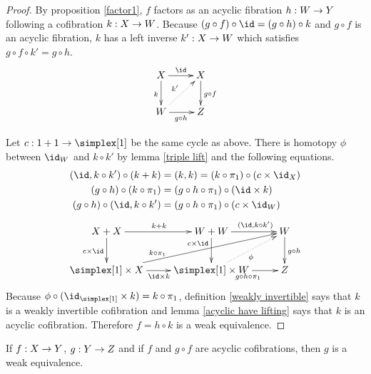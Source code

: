 \documentclass[csh.tex]{subfiles}
\begin{document}
\begin{proof} By proposition \ref{factor1}, $f$ factors as an acyclic fibration $h: W\to Y$ following a cofibration $k: X\to W$. Because $(g\circ f)\circ \id = (g\circ h)\circ k$ and $g\circ f$ is an acyclic fibration, $k$ has a left inverse $k': X\to W$ which satisfies $g\circ f\circ k' = g\circ h$. 
\[\xymatrix{
X\ar[d]_k \ar[r]^\id & X\ar[d]^{g\circ f}\\
W\ar[r]_{g\circ h} \ar@{.>}[ur]^{k'} & Z
}\]

Let $c\of 1+1\to\simplex[1]$ be the same cycle as above. There is homotopy $\phi$ between $\id_W$ and $k\circ k'$ by lemma \ref{triple lift} and the following equations.
\begin{align*}
(\id,k\circ k')\circ(k+k) &= (k,k) = (k\circ\pi_1)\circ (c\times\id_X)\\
(g\circ h)\circ (k\circ \pi_1) &= (g\circ h\circ \pi_1)\circ(\id\times k)\\
(g\circ h)\circ (\id,k\circ k') &= (g\circ h\circ \pi_1)\circ(c\times\id_W)
\end{align*}
\[\xymatrix{
X+X \ar[d]_{c\times \id}\ar[r]^{k+k} & W+W\ar[d]_(.3){c\times\id}\ar[r]^(.6){(\id,k\circ k')} & W\ar[d]^{g\circ h}\\
\simplex[1]\times X \ar[r]_{\id\times k}\ar[urr]^(.3){k\circ\pi_1}& \simplex[1]\times W\ar[r]_{g\circ h\circ \pi_1}\ar@{.>}[ur]_\phi & Z
}\]
Because $\phi\circ (\id_{\simplex[1]}\times k)=k\circ \pi_1$, definition \ref{weakly invertible} says that $k$ is a weakly invertible cofibration and lemma \ref{acyclic have lifting} says that $k$ is an acyclic cofibration. Therefore $f = h\circ k$ is a weak equivalence.\end{proof}

\begin{lemma} If $f: X\to Y$, $g: Y\to Z$ and if $f$ and $g\circ f$ are acyclic cofibrations, then $g$ is a weak equivalence.\label{shared retract} \end{lemma}
\end{document}
